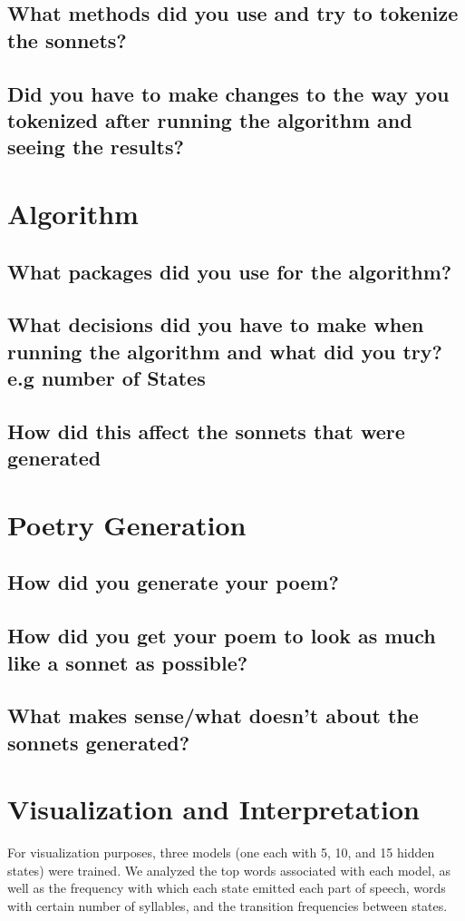 \subsection{What methods did you use and try to tokenize the sonnets?}
\subsection{Did you have to make changes to the way you tokenized after running the algorithm and seeing the results?}


\section{Algorithm}
\medskip

\subsection{What packages did you use for the algorithm?}
\subsection{What decisions did you have to make when running the algorithm and what did you try? e.g number of States}
\subsection{How did this affect the sonnets that were generated}

\section{Poetry Generation}
\medskip

\subsection{How did you generate your poem?}
\subsection{How did you get your poem to look as much like a sonnet as possible?}
\subsection{What makes sense/what doesn't about the sonnets generated?}


\section{Visualization and Interpretation}
For visualization purposes, three models (one each with 5, 10, and 15 hidden states) were trained. We analyzed the top words associated with each model, as well as the frequency with which each state emitted each part of speech, words with certain number of syllables, and the transition frequencies between states.

